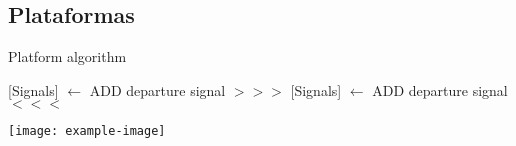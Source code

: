 \subsection{Plataformas}

    \lipsum[1-2]

    \begin{algorithm}[hbt!]
        \caption{Platform algorithm}\label{alg:PTF}
        \DontPrintSemicolon
        \SetNoFillComment
        \LinesNotNumbered 
        {
            [Signals] $\gets$ ADD departure signal $>>>$\;
            [Signals] $\gets$ ADD departure signal $<<<$\;
        }
        \KwResult{[Signals]} 
    \end{algorithm}

    \lipsum[1]
    \texttt{[image: example-image]}\\
    \lipsum[1-2]